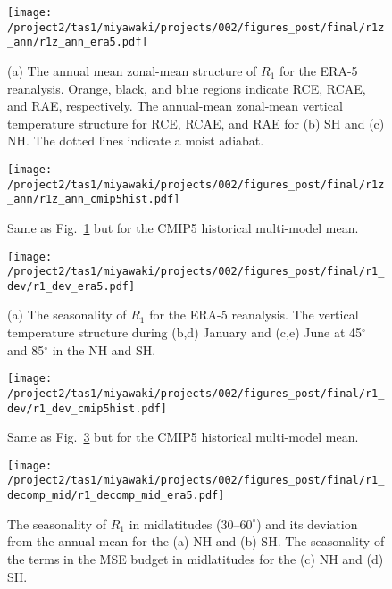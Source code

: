 \documentclass{ametsocV5}
\begin{document}
\begin{figure}[t]
  \noindent\texttt{[image: /project2/tas1/miyawaki/projects/002/figures\_post/final/r1z\_ann/r1z\_ann\_era5.pdf]}\\
  \caption{(a) The annual mean zonal-mean structure of $R_{1}$ for the ERA-5 reanalysis. Orange, black, and blue regions indicate RCE, RCAE, and RAE, respectively. The annual-mean zonal-mean vertical temperature structure for RCE, RCAE, and RAE for (b) SH and (c) NH. The dotted lines indicate a moist adiabat.}
  \label{fig:era5-r1-ann}
\end{figure}

\begin{figure}[t]
  \noindent\texttt{[image: /project2/tas1/miyawaki/projects/002/figures\_post/final/r1z\_ann/r1z\_ann\_cmip5hist.pdf]}\\
  \caption{Same as Fig.~\ref{fig:era5-r1-ann} but for the CMIP5 historical multi-model mean.}
  \label{fig:cmip5hist-r1-ann}
\end{figure}

\begin{figure}[t]
  \noindent\texttt{[image: /project2/tas1/miyawaki/projects/002/figures\_post/final/r1\_dev/r1\_dev\_era5.pdf]}\\
  \caption{(a) The seasonality of $R_{1}$ for the ERA-5 reanalysis. The vertical temperature structure during (b,d) January and (c,e) June at 45$^{\circ}$ and 85$^{\circ}$ in the NH and SH.}
  \label{fig:era5-r1-dev}
\end{figure}

\begin{figure}[t]
  \noindent\texttt{[image: /project2/tas1/miyawaki/projects/002/figures\_post/final/r1\_dev/r1\_dev\_cmip5hist.pdf]}\\
  \caption{Same as Fig.~\ref{fig:era5-r1-dev} but for the CMIP5 historical multi-model mean.}
  \label{fig:cmip5hist-r1-dev}
\end{figure}

\begin{figure}[t]
  \noindent\texttt{[image: /project2/tas1/miyawaki/projects/002/figures\_post/final/r1\_decomp\_mid/r1\_decomp\_mid\_era5.pdf]}\\
  \caption{The seasonality of $R_{1}$ in midlatitudes ($30$--$60^{\circ}$) and its deviation from the annual-mean for the (a) NH and (b) SH. The seasonality of the terms in the MSE budget in midlatitudes for the (c) NH and (d) SH.}
  \label{fig:era5-r1-decomp-mid}
\end{figure}
\end{document}
